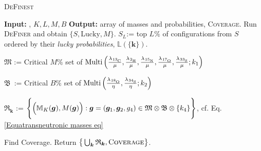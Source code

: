 \begin{algorithm}\caption{\textsc{DeFinest}}\label{DeFinest code}
\begin{algorithmic}
	\State	\textbf{Input:} \molecule, $K, L, M, B$
	\State 	\textbf{Output:} array of masses and probabilities, \textsc{Coverage}.
	\State 	Run \textsc{DeFiner} and obtain $\{ S, \mathrm{Lucky}, M\}$.
	\State 	$S_L$:= top $L\%$ of configurations from $S$ ordered by their {\it lucky probabilities}, $\mathbb{L}(\{ \bm{k} \})$.
	

		\State $\mathfrak{M}$ := Critical $M\%$ set of $\mathrm{Multi} \left(
				\frac{ \lambda_\cem{^{13}C} }{ \mu }, 
				\frac{ \lambda_\cem{^{2} H} }{ \mu }, 
				\frac{ \lambda_\cem{^{15}N} }{ \mu },
				\frac{ \lambda_\cem{^{17}O} }{ \mu }, 
				\frac{ \lambda_\cem{^{33}S} }{ \mu }; 
				k_1
			\right )$

		\State $\mathfrak{B}$ \,:= Critical $B\%$ set of 
		$\mathrm{Multi} \left(
			\frac{ \lambda_\cem{^{18}O} }{ \eta },
			\frac{ \lambda_\cem{^{34}S} }{ \eta }; 
			k_2	
		\right)$		

		\State $\mathfrak{R}_{\bm{k}}$ := $ 
			\Bigg\{ 
				\Big( 
					\mathbb{M}_K( \bm{g} ), 
					M( \bm{g} )
				\Big) : \bm{g} = ( \bm{g}_1, \bm{g}_2, g_4 ) \in \mathfrak{M} \otimes \mathfrak{B} \otimes \{ k_4 \}  
			\Bigg\}$, cf. Eq. \eqref{Equatransneutronic masses eq} 
	\ENDFORALL

	\State 	Find {\sc Coverage}.
	\State 	Return $\big\{ \bigcup _{\bm{k}} \mathfrak{R}_{\bm{k}}, \textsc{Coverage} \big\}$.
\end{algorithmic}	
\end{algorithm}